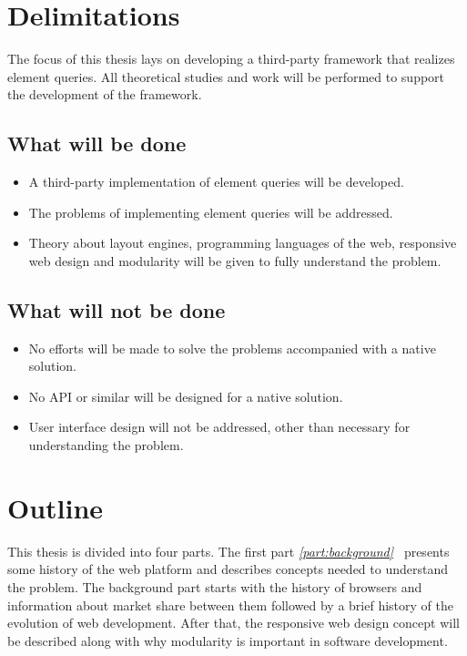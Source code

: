\documentclass[a4paper,11pt]{kth-mag}
\begin{document}
    \section{Delimitations}
      The focus of this thesis lays on developing a \gls{third-party} framework that realizes element queries.
      All theoretical studies and work will be performed to support the development of the framework.

      \subsection{What will be done}
      \begin{itemize}
      \item A \gls{third-party} implementation of element queries will be developed.
      \item The problems of implementing element queries  will be addressed.
      \item Theory about \glspl{layout engine}, programming languages of the web, \gls{responsive} \gls{web} design and modularity will be given to fully understand the problem.
      \end{itemize}

      \subsection{What will not be done}
      \begin{itemize}
      \item No efforts will be made to solve the problems accompanied with a \gls{native} solution.
      \item No \gls{API} or similar will be designed for a \gls{native} solution.
      \item User interface design will not be addressed, other than necessary for understanding the problem.
      \end{itemize}
    \section{Outline}
      This thesis is divided into four parts. The first part \emph{\ref{part:background}~} presents some history of the \gls{web} platform and describes concepts needed to understand the problem.
      The background part starts with the history of \glspl{browser} and information about market share between them followed by a brief history of the evolution of \gls{web} development.
      After that, the \gls{responsive} \gls{web} design concept will be described along with why modularity is important in software development.
\end{document}
